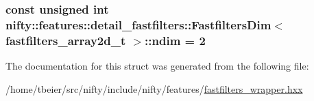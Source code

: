 \subsubsection[{ndim}]{\setlength{\rightskip}{0pt plus 5cm}const unsigned int {\bf nifty\+::features\+::detail\+\_\+fastfilters\+::\+Fastfilters\+Dim}$<$ fastfilters\+\_\+array2d\+\_\+t $>$\+::ndim = 2\hspace{0.3cm}{\ttfamily [static]}}\label{structnifty_1_1features_1_1detail__fastfilters_1_1FastfiltersDim_3_01fastfilters__array2d__t_01_4_ab0716a0f677fcbc75feb94ff1b05604e}


The documentation for this struct was generated from the following file\+:\begin{DoxyCompactItemize}
\item 
/home/tbeier/src/nifty/include/nifty/features/\hyperlink{fastfilters__wrapper_8hxx}{fastfilters\+\_\+wrapper.\+hxx}\end{DoxyCompactItemize}
